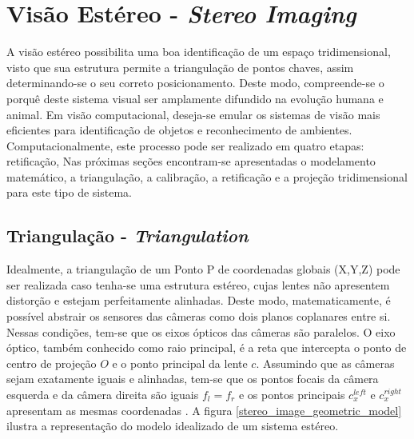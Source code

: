 \chapter{Visão Estéreo - \textit{Stereo Imaging}}
\label{Revisão Bibliográfica}


A visão estéreo possibilita uma boa identificação de um espaço tridimensional, visto que sua estrutura permite a triangulação de pontos chaves, assim determinando-se o seu correto posicionamento. Deste modo, compreende-se o porquê deste sistema visual ser amplamente difundido na evolução humana e animal. Em visão computacional, deseja-se emular os sistemas de visão mais eficientes para identificação de objetos e reconhecimento de ambientes. Computacionalmente, este processo pode ser realizado em quatro etapas: retificação,  Nas próximas seções encontram-se apresentadas o modelamento matemático, a triangulação, a calibração, a retificação e a projeção tridimensional para este tipo de sistema. 


\section{Triangulação - \textit{Triangulation}}

Idealmente, a triangulação de um Ponto P de coordenadas globais (X,Y,Z) pode ser realizada caso tenha-se uma estrutura estéreo, cujas lentes não apresentem distorção e estejam perfeitamente alinhadas. Deste modo, matematicamente, é possível abstrair os sensores das câmeras como dois planos coplanares entre si. Nessas condições, tem-se que os eixos ópticos das câmeras são paralelos. O eixo óptico, também conhecido como raio principal, é a reta que intercepta o ponto de centro de projeção ${O}$ e o ponto principal da lente ${c}$. Assumindo que as câmeras sejam exatamente iguais e alinhadas, tem-se que os pontos focais da câmera esquerda e da câmera direita são iguais ${f_l = f_r}$ e os pontos principais ${c^{left}_x}$ e  ${c^{right}_x}$ apresentam as mesmas coordenadas \cite{Bradski2008}. A figura \ref{stereo_image_geometric_model} ilustra a representação do modelo idealizado de um sistema estéreo.


